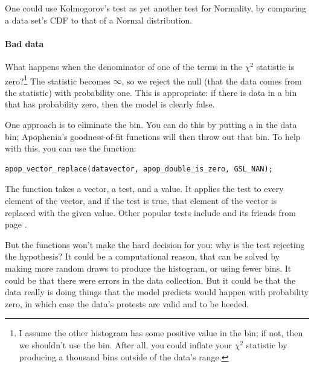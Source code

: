 One could use Kolmogorov's test as yet another test for Normality, by
comparing a data set's CDF to that of a Normal distribution.



\paragraph{\treesymbol Bad data} What happens when the denominator of
one of the terms in the $\chi^2$ statistic is zero?\footnote{I assume
the other histogram has some positive value in the bin; if not, then
we shouldn't use the bin. After all, you could inflate your $\chi^2$
statistic by producing a thousand bins outside of the data's range.} The
statistic becomes $\infty$, so we reject the null (that the data comes
from the statistic) with probability one. This is appropriate: if there is
data in a bin that has probability zero, then the model is clearly false.

One approach is to eliminate the bin. You can do this by putting a
 in the data bin; Apophenia's goodness-of-fit functions will
then throw out that bin. To help with this, you can use the
 function:
\begin{lstlisting}
apop_vector_replace(datavector, apop_double_is_zero, GSL_NAN);
\end{lstlisting}
The function takes a vector, a test, and a  value. It
applies the test to every element of the vector, and if the test is
true, that element of the vector is replaced with the given value. Other
popular tests include  and its friends from page
\pageref{numbers}.

But the functions won't make the hard decision for you: why is the test
rejecting the hypothesis? It could be a computational reason, that can be solved by  making more random draws to produce the histogram, or using fewer bins.
It could be that there were errors in the  data collection.
But it could be that the data really is doing things that the model
predicts would happen with probability zero, in which case the data's
protests are valid and to be heeded.

